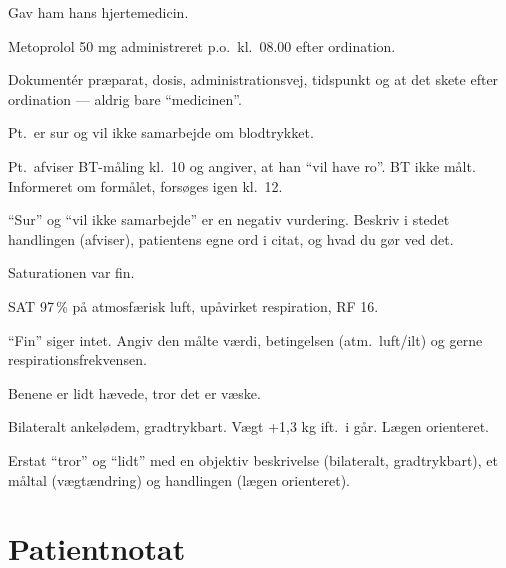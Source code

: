 \documentclass[11pt,a4paper]{report}
\begin{document}
\begin{daarligbox}Gav ham hans hjertemedicin.\end{daarligbox}
\begin{godbox}Metoprolol 50 mg administreret p.o.\ kl.\ 08.00 efter ordination.\end{godbox}
\begin{hvorforbox}Dokumentér præparat, dosis, administrationsvej, tidspunkt og at det skete efter ordination --- aldrig bare ``medicinen''.\end{hvorforbox}
\medskip

\begin{daarligbox}Pt.\ er sur og vil ikke samarbejde om blodtrykket.\end{daarligbox}
\begin{godbox}Pt.\ afviser BT-måling kl.\ 10 og angiver, at han ``vil have ro''. BT ikke målt. Informeret om formålet, forsøges igen kl.\ 12.\end{godbox}
\begin{hvorforbox}``Sur'' og ``vil ikke samarbejde'' er en negativ vurdering. Beskriv i stedet handlingen (afviser), patientens egne ord i citat, og hvad du gør ved det.\end{hvorforbox}
\medskip

\begin{daarligbox}Saturationen var fin.\end{daarligbox}
\begin{godbox}SAT 97\,\% på atmosfærisk luft, upåvirket respiration, RF 16.\end{godbox}
\begin{hvorforbox}``Fin'' siger intet. Angiv den målte værdi, betingelsen (atm.\ luft/ilt) og gerne respirationsfrekvensen.\end{hvorforbox}
\medskip

\begin{daarligbox}Benene er lidt hævede, tror det er væske.\end{daarligbox}
\begin{godbox}Bilateralt ankelødem, gradtrykbart. Vægt +1,3 kg ift.\ i går. Lægen orienteret.\end{godbox}
\begin{hvorforbox}Erstat ``tror'' og ``lidt'' med en objektiv beskrivelse (bilateralt, gradtrykbart), et måltal (vægtændring) og handlingen (lægen orienteret).\end{hvorforbox}

\section{Patientnotat}
\end{document}
